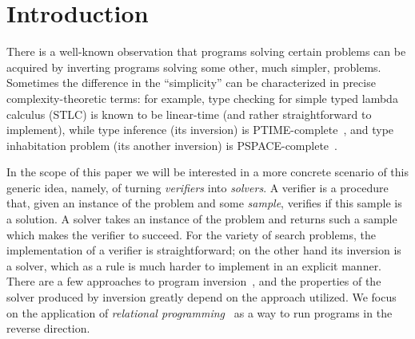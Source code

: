 \section{Introduction}


There is a well-known observation\cite{lozov2019relational,SemanticsModifiers1} that programs solving certain problems can be acquired by inverting programs solving some other, much simpler, problems.
Sometimes the difference in the ``simplicity'' can be characterized in precise complexity-theoretic terms: for example, type checking for simple typed lambda calculus (STLC) is known to be linear-time (and rather straightforward to implement), while type inference (its inversion) is PTIME-complete~\cite{mairson2004linear}, and type inhabitation problem (its another inversion) is PSPACE-complete~\cite{urzyczyn1997inhabitation}.

In the scope of this paper we will be interested in a more concrete scenario of this generic idea, namely, of turning \emph{verifiers} into \emph{solvers}.
A verifier is a procedure that, given an instance of the problem and some \emph{sample}, verifies if this sample is a solution.
A solver takes an instance of the problem and returns such a sample which makes the verifier to succeed.
For the variety of search problems, the implementation of a verifier is straightforward; on the other hand its inversion is a solver, which as a rule is much harder to implement in an explicit manner.
There are a few approaches to program inversion~\cite{RevURA,aman2020foundations}, and the properties of the solver produced by inversion greatly depend on the approach utilized.
We focus on the application of \emph{relational programming}~\cite{TheReasonedSchemer} as a way to run programs in the reverse direction.



